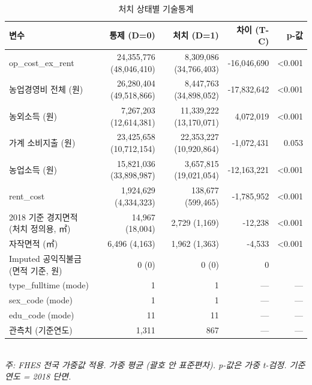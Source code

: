 \begin{table}[t]
\centering
\caption{처치 상태별 기술통계}
\label{tab:descriptives_ko}
\begin{tabular}{lrrrr}
\toprule
변수 & 통제 (D=0) & 처치 (D=1) & 차이 (T-C) & p-값 \\
\midrule
op\_cost\_ex\_rent & 24,355,776 (48,046,410) & 8,309,086 (34,766,403) & -16,046,690 & <0.001 \\
농업경영비 전체 (원) & 26,280,404 (49,518,866) & 8,447,763 (34,898,052) & -17,832,642 & <0.001 \\
농외소득 (원) & 7,267,203 (12,614,381) & 11,339,222 (13,170,071) & 4,072,019 & <0.001 \\
가계 소비지출 (원) & 23,425,658 (10,712,154) & 22,353,227 (10,920,864) & -1,072,431 & 0.053 \\
농업소득 (원) & 15,821,036 (33,898,987) & 3,657,815 (19,021,054) & -12,163,221 & <0.001 \\
rent\_cost & 1,924,629 (4,334,323) & 138,677 (599,465) & -1,785,952 & <0.001 \\
2018 기준 경지면적 (처치 정의용, ㎡) & 14,967 (18,004) & 2,729 (1,169) & -12,238 & <0.001 \\
자작면적 (㎡) & 6,496 (4,163) & 1,962 (1,363) & -4,533 & <0.001 \\
Imputed 공익직불금 (면적 기준, 원) & 0 (0) & 0 (0) & 0 &  \\
type\_fulltime (mode) & 1 & 1 & --- & --- \\
sex\_code (mode) & 1 & 1 & --- & --- \\
edu\_code (mode) & 11 & 11 & --- & --- \\
관측치 (기준연도) & 1,311 & 867 & --- & --- \\
\bottomrule
\end{tabular}
\\
\footnotesize\textit{주: FHES 전국 가중값 적용. 가중 평균 (괄호 안 표준편차). p-값은 가중 t-검정. 기준연도 = 2018 단면.}
\end{table}


